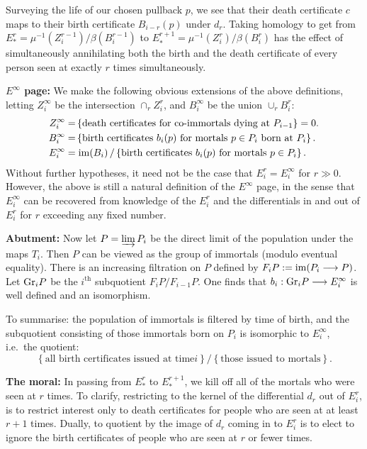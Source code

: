 \documentclass[11pt]{article}
\begin{document}
Surveying the life of our chosen pullback $p$, we see that their death
certificate $c$ maps to their birth certificate $B_{i-r}(p)$ under $d_r$. Taking
homology to get from $E_*^r=\mu^{-1}(Z_{i}^{r-1})/\beta(B_{i}^{r-1})$ to
$E_*^{r+1}=\mu^{-1}(Z_{i}^{r})/\beta(B_{i}^{r})$ has the effect of
simultaneously annihilating both the birth and the death certificate of every
person seen at exactly $r$ times simultaneously.

\Bullet \textbf{$E^\infty$ page:} We make the following obvious extensions of
the above definitions, letting $Z^\infty_i$ be the intersection $\cap_rZ^r_i$,
and $B^\infty_i$ be the union $\cup_rB^r_i$:
\begin{alignat*}{2}
Z_{i}^\infty
=&\left\{\text{death certificates for co-immortals dying at
$P_{i-1}$}\right\}=0.\\
B_{i}^\infty=&\left\{\text{birth certificates $b_i(p)$ for mortals $p\in
 P_i$ born at $P_i$}\right\}.\\
E_{i}^{\infty}=&\left.\operatorname{im}(B_i)\,/\left\{\text{birth certificates $b_i(p)$ for
 mortals $p\in P_i$}\right\}.\right.
\end{alignat*}
Without further hypotheses, it need not be the case that $E_i^r= E_i^\infty$ for
$r\gg0$. However, the above is still a natural definition of the $E^\infty$
page, in the sense that $E^\infty_i$ can be recovered from knowledge of the
$E^r_i$ and the differentials in and out of $E^r_i$ for $r$ exceeding any fixed
number.

\Bullet \textbf{Abutment:} Now let $P=\varinjlim P_i$ be the direct limit of the
population under the maps $T_i$. Then $P$ can be viewed as the group of
immortals (modulo eventual equality). There is an increasing filtration on $P$
defined by $F_{i}P:=\operatorname{im}(P_i\longrightarrow P)$. Let $\textup{Gr}_{i}P$ be the $i^\text{th}$
subquotient $F_{i}P/F_{i-1}P$. One finds that $b_i:\textup{Gr}_iP\longrightarrow E^\infty_i$ is well
defined and an isomorphism.

To summarise: the population of immortals is filtered by time of birth, and the
subquotient consisting of those immortals born on $P_i$ is isomorphic to
$E_i^\infty$, i.e.\ the quotient:
\[\left\{\text{all birth certificates issued at time
$i$}\right\}/\left\{\text{those issued to mortals}\right\}.\]

\Bullet \textbf{The moral:} In passing from $E_*^{r}$ to $E_*^{r+1}$, we kill
off all of the mortals who were seen at $r$ times. To clarify, restricting to
the kernel of the differential $d_r$ out of $E^r_i$, is to restrict interest
only to death certificates for people who are seen at at least $r+1$ times.
Dually, to quotient by the image of $d_r$ coming in to $E^r_i$ is to elect to
ignore the birth certificates of people who are seen at $r$ or fewer times.
\end{document}
